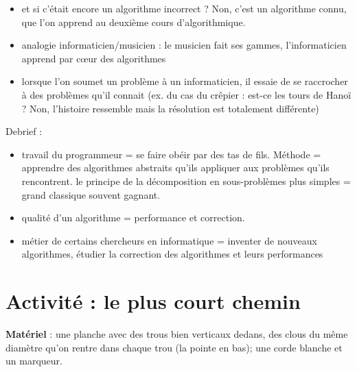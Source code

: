 \documentclass[a4paper]{article}
\newcommand{\titre}[1]{\medskip\noindent\textbf{#1} : }
\newcommand{\materiel}{\titre{Matériel}}
\begin{document}
\begin{itemize}
\begin{itemize}
\begin{itemize}
\item et si c'était encore un algorithme incorrect ? Non, c'est un algorithme connu, que l'on apprend au deuxième cours d'algorithmique.
\item analogie informaticien/musicien : le musicien fait ses gammes, l'informaticien apprend par c\oe{}ur des algorithmes
\item lorsque l'on soumet un problème à un informaticien, il essaie de se raccrocher à des problèmes qu'il connait (ex. du cas du crêpier : est-ce les tours de Hanoï ? Non, l'histoire ressemble mais la résolution est totalement différente)
\end{itemize}
\end{itemize}
\end{itemize}

Debrief :
\begin{itemize}
\item travail du programmeur = se faire obéir par des tas de fils. Méthode = apprendre des algorithmes abstraits qu'ils appliquer aux problèmes qu'ils rencontrent. le principe de la décomposition en sous-problèmes plus simples = grand classique souvent gagnant.
\item qualité d'un algorithme = performance et correction.
\item métier de certains chercheurs en informatique = inventer de nouveaux algorithmes, étudier la correction des algorithmes et leurs performances
\end{itemize}



\section{Activité : le plus court chemin}

\materiel une planche avec des trous bien verticaux dedans, des clous du
même diamètre qu'on rentre dans chaque trou (la pointe en bas); une corde
blanche et un marqueur.
\end{document}
